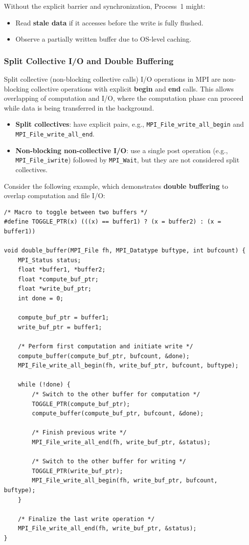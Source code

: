 \documentclass[12pt]{book}
\begin{document}
Without the explicit barrier and synchronization, Process~1 might:
\begin{itemize}
    \item Read \textbf{stale data} if it accesses before the write is fully flushed.
    \item Observe a partially written buffer due to OS-level caching.
\end{itemize}

\subsubsection{Split Collective I/O and Double Buffering}

Split collective (non-blocking collective calls) I/O operations in MPI are non-blocking collective operations with explicit \textbf{begin} and \textbf{end} calls.  
This allows overlapping of computation and I/O, where the computation phase can proceed while data is being transferred in the background.

\begin{itemize}
    \item \textbf{Split collectives}: have explicit pairs, e.g., \texttt{MPI\_File\_write\_all\_begin} and \texttt{MPI\_File\_write\_all\_end}.
    \item \textbf{Non-blocking non-collective I/O}: use a single post operation (e.g., \texttt{MPI\_File\_iwrite}) followed by \texttt{MPI\_Wait}, but they are not considered split collectives.
\end{itemize}

Consider the following example, which demonstrates \textbf{double buffering} to overlap computation and file I/O:

\begin{lstlisting}[style=cppstyle]
/* Macro to toggle between two buffers */
#define TOGGLE_PTR(x) (((x) == buffer1) ? (x = buffer2) : (x = buffer1))

void double_buffer(MPI_File fh, MPI_Datatype buftype, int bufcount) {
    MPI_Status status;
    float *buffer1, *buffer2;
    float *compute_buf_ptr;
    float *write_buf_ptr;
    int done = 0;

    compute_buf_ptr = buffer1;
    write_buf_ptr = buffer1;

    /* Perform first computation and initiate write */
    compute_buffer(compute_buf_ptr, bufcount, &done);
    MPI_File_write_all_begin(fh, write_buf_ptr, bufcount, buftype);

    while (!done) {
        /* Switch to the other buffer for computation */
        TOGGLE_PTR(compute_buf_ptr);
        compute_buffer(compute_buf_ptr, bufcount, &done);

        /* Finish previous write */
        MPI_File_write_all_end(fh, write_buf_ptr, &status);

        /* Switch to the other buffer for writing */
        TOGGLE_PTR(write_buf_ptr);
        MPI_File_write_all_begin(fh, write_buf_ptr, bufcount, buftype);
    }

    /* Finalize the last write operation */
    MPI_File_write_all_end(fh, write_buf_ptr, &status);
}
\end{lstlisting}
\end{document}
